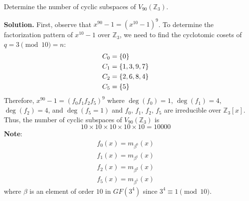 \begin{Example}{}{}
    Determine the number of cyclic subspaces of $ V_{90}(\mathbb{Z}_3) $.

    \textbf{Solution.} First, observe that $ x^{90}-1=(x^{10}-1)^9 $.
    To determine the factorization pattern of $ x^{10}-1 $
    over $ \mathbb{Z}_3 $, we need to find the cyclotomic cosets
    of $ q=3\pmod{10}=n $:
    \begin{align*}
        C_0 & =\{0\}       \\
        C_1 & =\{1,3,9,7\} \\
        C_2 & =\{2,6,8,4\} \\
        C_5 & =\{5\}
    \end{align*}
    Therefore, $ x^{90}-1=(f_0f_1f_2f_5)^9 $ where
    $ \deg(f_0)=1 $, $ \deg(f_1)=4 $, $ \deg(f_2)=4 $, and $ \deg(f_5=1) $
    and $ f_0,\,f_1,\,f_2,\,f_5 $ are irreducible over $ \mathbb{Z}_3[x] $.
    Thus, the number of cyclic subspaces of $ V_{90}(\mathbb{Z}_3) $
    is
    \[ 10\times 10\times 10\times 10\times 10=10 000 \]
    \textbf{Note}:
    \begin{align*}
        f_0(x)=m_{\beta^0}(x) \\
        f_1(x)=m_{\beta^1}(x) \\
        f_2(x)=m_{\beta^2}(x) \\
        f_5(x)=m_{\beta^5}(x)
    \end{align*}
    where $ \beta $ is an element of order $ 10 $ in $ GF(3^4) $
    since $ 3^4\equiv 1\pmod{10} $.
\end{Example}


